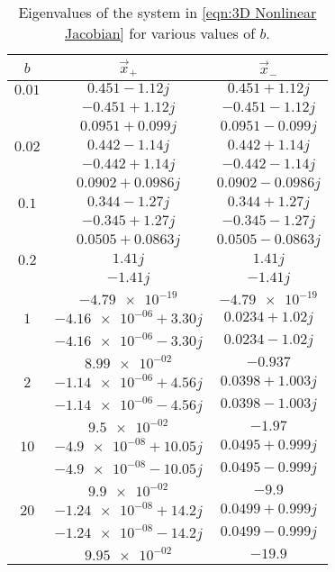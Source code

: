 \documentclass[12pt]{article}
\numberwithin{equation}{section}
\numberwithin{figure}{section}
\numberwithin{table}{section}
\begin{document}
    \begin{table}[H]
        \centering
        \begin{tabular}{c|c c}
            $b$ & $\vec x_+$ & $\vec x_-$\\
            \hline
            $0.01$ & $0.451-1.12j$ & $0.451+1.12j$\\
             & $-0.451+1.12j$ & $-0.451-1.12j$\\
             & $0.0951+0.099j$ & $0.0951-0.099j$\\
            $0.02$ & $0.442-1.14j$ & $0.442+1.14j$\\
             & $-0.442+1.14j$ & $-0.442-1.14j$\\
             & $0.0902+0.0986j$ & $0.0902-0.0986j$\\
            $0.1$ & $0.344-1.27j$ & $0.344+1.27j$\\
             & $-0.345+1.27j$ & $-0.345-1.27j$\\
             & $0.0505+0.0863j$ & $0.0505-0.0863j$\\
            $0.2$ & $1.41j$ & $1.41j$\\
             & $-1.41j$ & $-1.41j$\\
             & $\num{-4.79e-19}$ & $\num{-4.79e-19}$\\
            $1$ & $\num{-4.16e-06}+3.30j$ & $0.0234+1.02j$\\
             & $\num{-4.16e-06}-3.30j$ & $0.0234-1.02j$\\
             & $\num{8.99e-02}$ & $-0.937$\\
            $2$ & $\num{-1.14e-06}+4.56j$ & $0.0398+1.003j$\\
             & $\num{-1.14e-06}-4.56j$ & $0.0398-1.003j$\\
             & $\num{9.5e-02}$ & $-1.97$\\
            $10$ & $\num{-4.9e-08}+10.05j$ & $0.0495+0.999j$\\
             & $\num{-4.9e-08}-10.05j$ & $0.0495-0.999j$\\
             & $\num{9.9e-02}$ & $-9.9$\\
            $20$ & $\num{-1.24e-08}+14.2j$ & $0.0499+0.999j$\\
             & $\num{-1.24e-08}-14.2j$ & $0.0499-0.999j$\\
             & $\num{9.95e-02}$ & $-19.9$\\
        \end{tabular}
        \caption{Eigenvalues of the system in \autoref{eqn:3D Nonlinear Jacobian} for various 
        values of $b$.}
        \label{tbl:Eigenvalues}
    \end{table}
\end{document}
